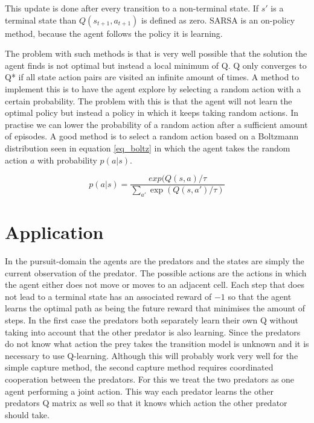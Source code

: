 \documentclass[10pt]{article}
\begin{document}
This update is done after every transition to a non-terminal state. If $s'$ is a terminal state than $Q(s_{t+1},a_{t+1})$ is defined as zero. SARSA is an on-policy method, because the agent follows the policy it is learning.

The problem with such methods is that is very well possible that the solution the agent finds is not optimal but instead a local minimum of Q. Q only converges to Q* if all state action pairs are visited an infinite amount of times. A method to implement this is to have the agent explore by selecting a random action with a certain probability. The problem with this is that the agent will not learn the optimal policy but instead a policy in which it keeps taking random actions. In practise we can lower the probability of a random action after a sufficient amount of episodes. A good method is to select a random action based on a Boltzmann distribution seen in equation \ref{eq_boltz} in which the agent takes the random action $a$ with probability $p(a|s)$.

\begin{equation}\label{eq_boltz}
	p(a|s) = \frac{exp(Q(s,a)/\tau}{\sum_{a'}\exp(Q(s,a')/\tau)}
\end{equation}



\section{Application}\label{application}
In the pursuit-domain the agents are the predators and the states are simply the current observation of the predator. The possible actions are the actions in which the agent either does not move or moves to an adjacent cell. Each step that does not lead to a terminal state has an associated reward of $-1$ so that the agent learns the optimal path as being the future reward that minimises the amount of steps. In the first case the predators both separately learn their own Q without taking into account that the other predator is also learning. Since the predators do not know what action the prey takes the transition model is unknown and it is necessary to use Q-learning. Although this will probably work very well for the simple capture method, the second capture method requires coordinated cooperation between the predators. For this we treat the two predators as one agent performing a joint action. This way each predator learns the other predators Q matrix as well so that it knows which action the other predator should take.
\end{document}
